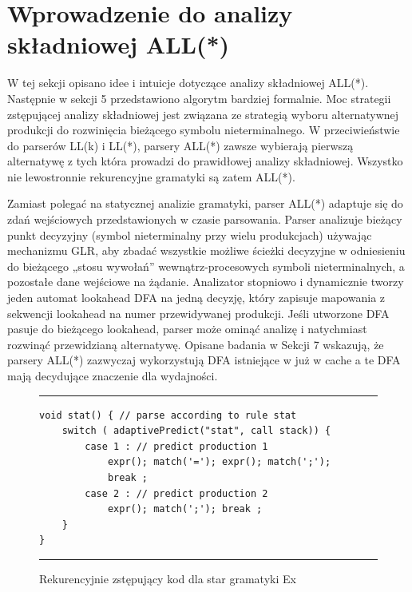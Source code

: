 \section{Wprowadzenie do analizy składniowej ALL(*)}
W tej sekcji opisano idee i intuicje dotyczące analizy składniowej ALL(*).
Następnie w sekcji 5 przedstawiono algorytm bardziej formalnie.
Moc strategii zstępującej analizy składniowej jest związana ze strategią wyboru
alternatywnej produkcji do rozwinięcia bieżącego symbolu nieterminalnego.
W przeciwieństwie do parserów LL(k) i LL(*), parsery ALL(*) zawsze wybierają
pierwszą alternatywę z tych która prowadzi do prawidłowej analizy składniowej.
Wszystko nie lewostronnie rekurencyjne gramatyki są zatem ALL(*).
\par
Zamiast polegać na statycznej analizie gramatyki,
parser ALL(*) adaptuje się do zdań wejściowych przedstawionych w czasie parsowania.
Parser analizuje bieżący punkt decyzyjny (symbol nieterminalny przy wielu produkcjach)
używając mechanizmu GLR, aby zbadać wszystkie możliwe ścieżki decyzyjne
w odniesieniu do bieżącego „stosu wywołań” wewnątrz-procesowych symboli nieterminalnych,
a pozostałe dane wejściowe na żądanie. Analizator stopniowo i dynamicznie
tworzy jeden automat lookahead DFA na jedną decyzję, który zapisuje mapowania
z sekwencji lookahead na numer przewidywanej produkcji.
Jeśli utworzone DFA pasuje do bieżącego lookahead, parser może ominąć analizę
i natychmiast rozwinąć przewidzianą alternatywę.
Opisane badania w Sekcji 7 wskazują, że parsery ALL(*) zazwyczaj wykorzystują
DFA istniejące w już w cache a te DFA mają decydujące znaczenie dla wydajności. 

\begin{figure}[!ht]
\noindent\rule{\linewidth}{0.3pt}
\begin{lstlisting}
void stat() { // parse according to rule stat
	switch ( adaptivePredict("stat", call stack)) {
		case 1 : // predict production 1
			expr(); match('='); expr(); match(';');
			break ;
		case 2 : // predict production 2
			expr(); match(';'); break ;
	}
}
\end{lstlisting}
\noindent\rule{\linewidth}{0.3pt}
\caption{Rekurencyjnie zstępujący kod dla star gramatyki Ex}
\end{figure}



